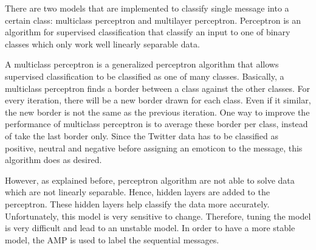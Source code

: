 There are two models that are implemented to classify single message into a certain class: multiclass perceptron and multilayer perceptron.
Perceptron is an algorithm for supervised classification that classify an input to one of binary classes which only work well linearly separable data.

A multiclass perceptron is a generalized perceptron algorithm that allows supervised classification to be classified as one of many classes.
Basically, a multiclass perceptron finds a border between a class against the other classes.
For every iteration, there will be a new border drawn for each class.
Even if it similar, the new border is not the same as the previous iteration.
One way to improve the performance of multiclass perceptron is to average these border per class, instead of take the last border only.
Since the Twitter data has to be classified as positive, neutral and negative before assigning an emoticon to the message, this algorithm does as desired.

However, as explained before, perceptron algorithm are not able to solve data which are not linearly separable.
Hence, hidden layers are added to the perceptron.
These hidden layers help classify the data more accurately.
Unfortunately, this model is very sensitive to change.
Therefore, tuning the model is very difficult and lead to an unstable model.
In order to have a more stable model, the AMP is used to label the sequential messages.
